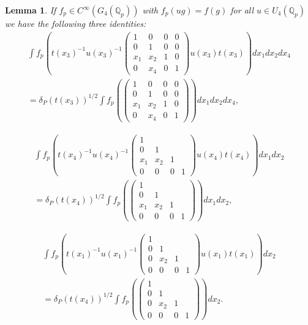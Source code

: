 \documentclass[11pt]{amsart}
\newtheorem{lemma}{Lemma}[section]
\begin{document}
\begin{lemma}
\label{lemma: main-lemma}
	If $f_p \in C^\infty(G_4(\mathbb{Q}_p))$ with $f_p(ug) = f(g)$ for all $u \in U_4(\mathbb{Q}_p)$ we have the following three identities: 
		\begin{multline}
			\int f_p\left(t(x_3)^{-1} u(x_3)^{-1} \left(\begin{smallmatrix}
				1 & 0 & 0 & 0 \\
				0 & 1 & 0 & 0 \\
				x_1 & x_2  & 1 & 0 \\
				0 & x_4 & 0 & 1
			\end{smallmatrix}\right) u(x_3) t(x_3) \right) dx_1 dx_2 dx_4\\
			= \delta_P(t(x_3))^{1/2} \int f_p\left( \left(\begin{smallmatrix}
				1 & 0 & 0 & 0 \\
				0 & 1 & 0 & 0 \\
				x_1 & x_2  & 1 & 0 \\
				0 & x_4 & 0 & 1
			\end{smallmatrix}\right)\right) dx_1 dx_2 dx_4, 
			\label{eqn: eliminating-c}
		\end{multline}
		
		\begin{multline}
			\int f_p \left( t(x_4)^{-1}u(x_4)^{-1} \left(\begin{smallmatrix} 1 & & & \\ 0 & 1 & & \\ x_1 & x_2 & 1 & \\ 0 & 0 & 0 & 1 \end{smallmatrix}\right) 
			u(x_4)t(x_4)\right) dx_1 dx_2 \\
			= \delta_P(t(x_4))^{1/2} \int f_p\left( \left(\begin{smallmatrix} 1 & & & \\ 0 & 1 & & \\ x_1 & x_2 & 1 & \\ 0 & 0 & 0 & 1 \end{smallmatrix}\right)\right) dx_1 dx_2,
			\label{eqn: eliminating-d}
		\end{multline}
		
		\begin{multline}
			\int f_p \left( t(x_1)^{-1}u(x_1)^{-1} \left(\begin{smallmatrix} 1 & & & \\ 0 & 1 & & \\ 0 & x_2 & 1 & \\ 0 & 0 & 0 & 1\end{smallmatrix}\right)
			u(x_1) t(x_1) \right) dx_2 \\
			= \delta_P(t(x_4))^{1/2} \int f_p\left( \left(\begin{smallmatrix} 1 & & & \\ 0 & 1 & & \\ 0 & x_2 & 1 & \\ 0 & 0 & 0 & 1\end{smallmatrix}\right) \right) dx_2.
			\label{eqn: eliminating-a}
		\end{multline}
\end{lemma}
\end{document}

